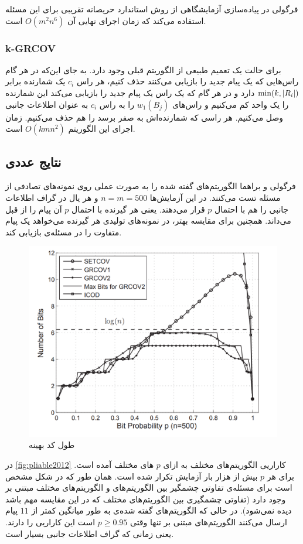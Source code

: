 فرگولی در پیاده‌سازی آزمایشگاهی از روش استاندارد حریصانه تقریبی برای این مسئله استفاده می‌کند که زمان اجرای نهایی آن
$O(m^2 n^6)$
است.

\subsubsection{k-GRCOV}
برای حالت
\picodt
یک تعمیم طبیعی از الگوریتم قبلی وجود دارد. به جای این‌که در هر گام راس‌هایی که یک پیام جدید را بازیابی می‌کنند حذف کنیم، هر راس
$c_i$
یک شمارنده برابر
$\min(k, \left|{R_i}\right|)$
دارد و در هر گام که یک راس یک پیام جدید را بازیابی می‌کند این شمارنده را یک واحد کم می‌کنیم و راس‌های
$w_1(B_j)$
را به راس
$c_i$
به عنوان اطلاعات جانبی وصل می‌کنیم. هر راسی که شمارنده‌اش به صفر برسد را هم حذف می‌کنیم. زمان اجرای این الگوریتم
$O(kmn^2)$
است.

\subsection{
    نتایج عددی
}
فرگولی و براهما الگوریتم‌های گفته شده را به صورت عملی روی نمونه‌های تصادفی از مسئله تست می‌کنند. در این آزمایش‌ها
$n = m = 500$
و هر یال در گراف اطلاعات جانبی را هم با احتمال
$p$
قرار می‌دهند. یعنی هر گیرنده با احتمال
$p$
آن پیام را از قبل می‌داند. همچنین برای مقایسه بهتر، در نمونه‌های تولیدی هر گیرنده می‌خواهد یک پیام متفاوت را در مسئله‌ی
\icod
بازیابی کند.
\begin{figure}
    \centering
    \includegraphics[width=0.7\linewidth]{figs/ch3/pliable2012}
    \caption[
        طول کد بهینه
    ]{طول کد بهینه\cite{pliablefirstpaper}}
    \label{fig:pliable2012}
\end{figure}

در
\autoref{fig:pliable2012}
کاراریی الگوریتم‌های مختلف به ازای
$p$
های مختلف آمده است. برای هر
$p$
بیش از هزار بار آزمایش تکرار شده است. همان طور که در شکل مشخص است برای مسئله‌ی \picod تفاوتی چشمگیر بین الگوریتم‌های
\picod
و الگوریتم‌های مختلف مبتنی بر
\icod
وجود دارد (تفاوتی چشمگیری بین الگوریتم‌های مختلف
\icod
که در این مقایسه مهم باشد دیده نمی‌شود). در حالی که الگوریتم‌های گفته شده‌ی
\picod
به طور میانگین کمتر از
$11$
پیام ارسال می‌کنند الگوریتم‌های مبتنی بر
\icod
تنها وقتی
$p \geq 0.95$
است این کاراریی را دارند. یعنی زمانی که گراف اطلاعات جانبی بسیار  است.

